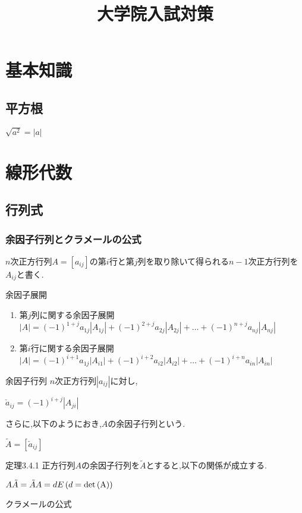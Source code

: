 \documentclass[a4paper]{jsarticle}
\author{}
\title{大学院入試対策}
\date{}
\begin{document}
\maketitle

\section{基本知識}
\subsection{平方根}
$\sqrt{a^2}=|a|$

\section{線形代数}
\subsection{行列式}
\subsubsection{余因子行列とクラメールの公式}
$n$次正方行列$A=\left[a_{ij}\right]$の第$i$行と第$j$列を取り除いて得られる$n-1$次正方行列を$A_{ij}$と書く.
\begin{itembox}[l]{余因子展開}
    \begin{enumerate}[(1)]
        \item 第$j$列に関する余因子展開\\
              $\left|A\right|=(-1)^{1+j}a_{1j}\left|A_{1j}\right|+(-1)^{2+j}a_{2j}\left|A_{2j}\right|+ \dots +(-1)^{n+j}a_{nj}\left|A_{nj}\right|$
        \item 第$i$行に関する余因子展開\\
              $\left|A\right|=(-1)^{i+1}a_{1j}\left|A_{i1}\right|+(-1)^{i+2}a_{i2}\left|A_{i2}\right|+ \dots +(-1)^{i+n}a_{in}\left|A_{in}\right|$
    \end{enumerate}
\end{itembox}
\begin{itembox}[l]{余因子行列}
    $n$次正方行列$\left|a_{ij}\right|$に対し,
    \begin{center}
        $\check{a}_{ij}=\left(-1\right)^{i+j}\left|A_{ji}\right|$
    \end{center}
    さらに,以下のようにおき,$A$の余因子行列という.
    \begin{center}
        $\tilde{A}=\left[\check{a}_{ij}\right]$
    \end{center}
\end{itembox}
\begin{itembox}[l]{定理3.4.1}
    正方行列$A$の余因子行列を$\tilde{A}$とすると,以下の関係が成立する.
    \begin{center}
        $A\tilde{A}=\tilde{A}A=dE\left (d=\rm{det}\left(A\right)\right)$
    \end{center}
\end{itembox}
\begin{itembox}[l]{クラメールの公式}
\end{itembox}
\end{document}
